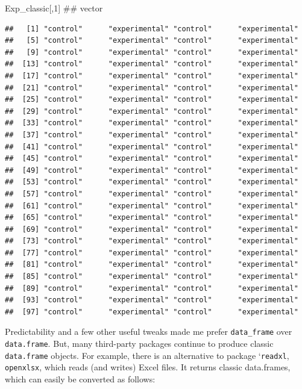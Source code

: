 \documentclass[]{svmono}
\newenvironment{Shaded}{\begin{snugshade}}{\end{snugshade}}
\newcommand{\DecValTok}[1]{\textcolor[rgb]{0.00,0.00,0.81}{#1}}
\newcommand{\NormalTok}[1]{#1}
\begin{document}
\begin{Shaded}
\begin{Highlighting}[]
\NormalTok{Exp_classic[,}\DecValTok{1}\NormalTok{]       ## vector}
\end{Highlighting}
\end{Shaded}

\begin{verbatim}
##   [1] "control"      "experimental" "control"      "experimental"
##   [5] "control"      "experimental" "control"      "experimental"
##   [9] "control"      "experimental" "control"      "experimental"
##  [13] "control"      "experimental" "control"      "experimental"
##  [17] "control"      "experimental" "control"      "experimental"
##  [21] "control"      "experimental" "control"      "experimental"
##  [25] "control"      "experimental" "control"      "experimental"
##  [29] "control"      "experimental" "control"      "experimental"
##  [33] "control"      "experimental" "control"      "experimental"
##  [37] "control"      "experimental" "control"      "experimental"
##  [41] "control"      "experimental" "control"      "experimental"
##  [45] "control"      "experimental" "control"      "experimental"
##  [49] "control"      "experimental" "control"      "experimental"
##  [53] "control"      "experimental" "control"      "experimental"
##  [57] "control"      "experimental" "control"      "experimental"
##  [61] "control"      "experimental" "control"      "experimental"
##  [65] "control"      "experimental" "control"      "experimental"
##  [69] "control"      "experimental" "control"      "experimental"
##  [73] "control"      "experimental" "control"      "experimental"
##  [77] "control"      "experimental" "control"      "experimental"
##  [81] "control"      "experimental" "control"      "experimental"
##  [85] "control"      "experimental" "control"      "experimental"
##  [89] "control"      "experimental" "control"      "experimental"
##  [93] "control"      "experimental" "control"      "experimental"
##  [97] "control"      "experimental" "control"      "experimental"
\end{verbatim}

Predictability and a few other useful tweaks made me prefer
\texttt{data\_frame} over \texttt{data.frame}. But, many third-party
packages continue to produce classic \texttt{data.frame} objects. For
example, there is an alternative to package `\texttt{readxl},
\texttt{openxlsx}, which reads (and writes) Excel files. It returns
classic data.frames, which can easily be converted as follows:
\end{document}
